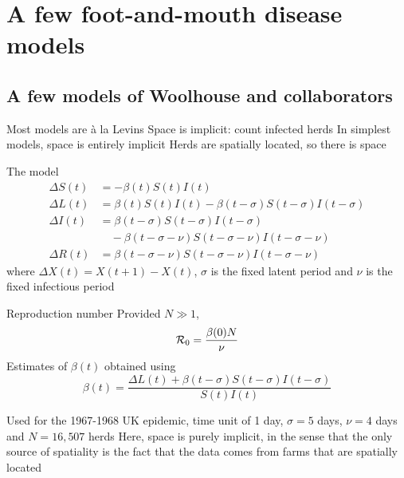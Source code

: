 \documentclass[aspectratio=43]{beamer}
\begin{document}
\section{A few foot-and-mouth disease models}

\subsection{A few models of Woolhouse and collaborators}
\begin{frame}{Most models are \`a la Levins}
    Space is implicit: count infected herds
	\vfill
	In simplest models, space is entirely implicit
	\vfill
	Herds are spatially located, so there is space
\end{frame}


\begin{frame}{The model}
	\begin{subequations}
		\begin{align}
			\Delta S(t) &= -\beta(t)S(t)I(t) \\
			\Delta L(t) &= \beta(t)S(t)I(t) -\beta(t-\sigma)S(t-\sigma)I(t-\sigma) \\
			\Delta I(t) &= \beta(t-\sigma)S(t-\sigma)I(t-\sigma) \nonumber \\
			&\quad -\beta(t-\sigma-\nu)S(t-\sigma-\nu)I(t-\sigma-\nu) \\
			\Delta R(t) &= \beta(t-\sigma-\nu)S(t-\sigma-\nu)I(t-\sigma-\nu)
		\end{align}
	\end{subequations}
	where $\Delta X(t)=X(t+1)-X(t)$, $\sigma$ is the fixed latent period and $\nu$ is the fixed infectious period
\end{frame}

\begin{frame}{Reproduction number}
	Provided $N\gg 1$, 
	\[
		\mathcal{R}_0=\frac{\beta(0)N}{\nu}
	\]
	\vfill
	Estimates of $\beta(t)$ obtained using
	\[
		\beta(t)=\frac{\Delta L(t)+\beta(t-\sigma)S(t-\sigma)I(t-\sigma)}{S(t)I(t)}
	\]
\end{frame}

\begin{frame}
	Used for the 1967-1968 UK epidemic, time unit of 1 day, $\sigma=5$ days, $\nu=4$ days and $N=16,507$ herds
	\vfill
	Here, space is purely implicit, in the sense that the only source of spatiality is the fact that the data comes from farms that are spatially located
\end{frame}
\end{document}
